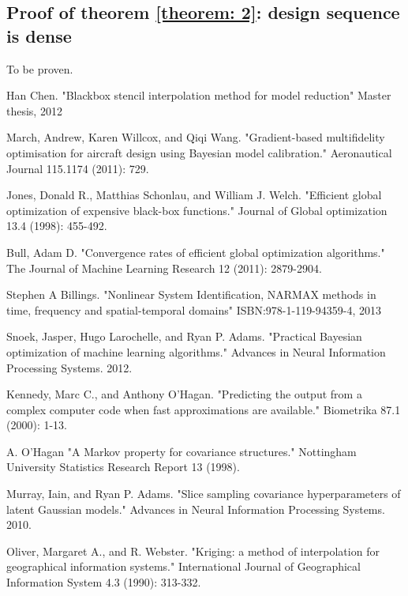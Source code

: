\documentclass[a4paper,onecolumn]{article}
\theoremstyle{remark}
\begin{document}
\begin{appendices}
    \section{Proof of theorem \ref{theorem: 2}: design sequence is dense}
    \label{proof convergence append}
    To be proven.
\end{appendices}

\begin{thebibliography}{9}
Han Chen.
"Blackbox stencil interpolation method for model reduction"
Master thesis, 2012
 

March, Andrew, Karen Willcox, and Qiqi Wang. 
"Gradient-based multifidelity optimisation for aircraft design using Bayesian model calibration." 
Aeronautical Journal 115.1174 (2011): 729.

Jones, Donald R., Matthias Schonlau, and William J. Welch. 
"Efficient global optimization of expensive black-box functions." 
Journal of Global optimization 13.4 (1998): 455-492.

Bull, Adam D. 
"Convergence rates of efficient global optimization algorithms." 
The Journal of Machine Learning Research 12 (2011): 2879-2904.

Stephen A Billings.
"Nonlinear System Identification, NARMAX methods in time, frequency and spatial-temporal domains"
ISBN:978-1-119-94359-4, 2013

Snoek, Jasper, Hugo Larochelle, and Ryan P. Adams. 
"Practical Bayesian optimization of machine learning algorithms." 
Advances in Neural Information Processing Systems. 2012.

Kennedy, Marc C., and Anthony O'Hagan. 
"Predicting the output from a complex computer code when fast approximations are available." 
Biometrika 87.1 (2000): 1-13.

A. O'Hagan 
"A Markov property for covariance structures." 
Nottingham University Statistics Research Report 13 (1998).

Murray, Iain, and Ryan P. Adams. 
"Slice sampling covariance hyperparameters of latent Gaussian models." 
Advances in Neural Information Processing Systems. 2010.

Oliver, Margaret A., and R. Webster. 
"Kriging: a method of interpolation for geographical information systems." 
International Journal of Geographical Information System 4.3 (1990): 313-332.


\end{thebibliography}
\end{document}

